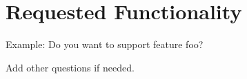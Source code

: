 \section{Requested Functionality}

\md

\begin{question}
Example:
Do you want \cry{} to support feature foo?
\end{question}

\begin{question}
Add other questions if needed.
\end{question}
